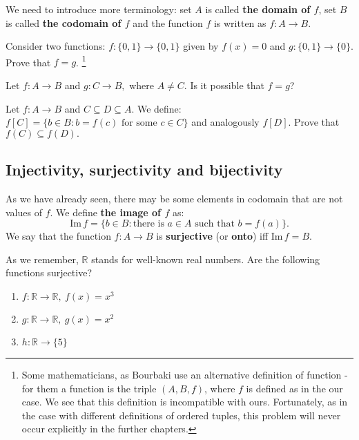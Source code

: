 We need to introduce more terminology: set $A$ is called \textbf{the domain of $f$}, set $B$ is called
\textbf{the codomain of $f$} and the function $f$ is written as $f: A\to B$.

\begin{prob}
	Consider two functions: $f:\{0, 1\}\to \{0,1\}$ given by $f(x)=0$ and $g:\{0,1\}\to\{0\}$.
	Prove that $f=g$.
	\footnote{Some mathematicians, as Bourbaki use an alternative definition of function - for them
	a function is the triple $(A,B,f)$, where $f$ is defined as in the our case. We see that this definition
	is incompatible with ours. Fortunately, as in the case with different definitions of ordered tuples,
	this problem will never occur explicitly in the further chapters.}
\end{prob}

\begin{prob}
	Let $f:A\to B$ and $g: C\to B,$ where $A\neq C$. Is it possible that $f=g$?
\end{prob}

\begin{prob}
	Let $f: A\to B$ and $C\subseteq D\subseteq A$. We define: $f[C] = \{b\in B : b=f(c) \text{ for some }c\in C \}$ and analogously $f[D]$. Prove that
	$f(C)\subseteq f(D).$
\end{prob}

\subsection{Injectivity, surjectivity and bijectivity}

\noindent As we have already seen, there may be some elements in codomain that are not values of
$f$. We define \textbf{the image of $f$} as:
$$\text{Im}\, f = \{b\in B : \text{there is } a\in A \text{ such that } b=f(a)\}.$$
We say that the function $f: A\to B$ is \textbf{surjective} (or \textbf{onto}) iff $\text{Im}\,f=B$.

\begin{prob}
	As we remember, $\mathbb{R}$ stands for well-known real numbers. Are the following functions surjective?
	\begin{enumerate}
		\item $f: \mathbb{R} \to \mathbb{R}, ~f(x)=x^3$
		\item $g: \mathbb{R} \to \mathbb{R}, ~g(x)=x^2$
		\item $h: \mathbb{R} \to \{5\}$
	\end{enumerate}
\end{prob}

